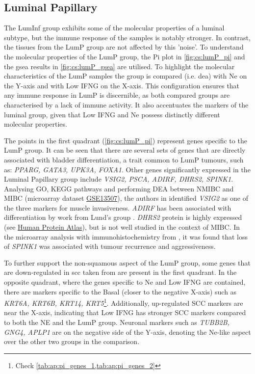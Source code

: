 \subsection{Luminal Papillary} \label{s:cs:lumP_interp}

The LumInf group exhibits some of the molecular properties of a luminal subtype, but the immune response of the samples is notably stronger. In contrast, the tissues from the LumP group are not affected by this 'noise'. To understand the molecular properties of the LumP group, the Pi plot in \cref{fig:cs:lumP_pi} and the \acrshort{gsea} results in \cref{fig:cs:lumP_gsea} are utilised. To highlight the molecular characteristics of the LumP samples the group  is compared  (i.e. \acrshort{dea}) with Ne on the Y-axis and with Low IFNG on the X-axis. This configuration ensures that any immune response in LumP is discernible, as both compared groups are characterised by a lack of immune activity. It also accentuates the markers of the luminal group, given that Low IFNG and Ne possess distinctly different molecular properties.

The points in the first quadrant (\cref{fig:cs:lumP_pi}) represent genes specific to the LumP group. It can be seen that there are several sets of genes that are directly associated with bladder differentiation, a trait common to LumP tumours, such as: \textit{PPARG, GATA3, UPK3A, FOXA1}. Other genes significantly expressed in the Luminal Papillary group include \textit{VSIG2, PSCA, ADIRF, DHRS2, SPINK1}. Analysing GO, KEGG pathways and performing DEA between NMIBC and MIBC (microarray dataset \href{https://www.ncbi.nlm.nih.gov/geo/query/acc.cgi?acc=GSE13507}{GSE13507}), the authors in \citet{He2021-de} identified \textit{VSIG2} as one of the three markers for muscle invasiveness. \textit{ADIRF} has been associated with differentiation by work from Lund's group \citep{Eriksson2015-lt}. \textit{DHRS2} protein is highly expressed (see \href{https://www.proteinatlas.org/ENSG00000100867-DHRS2/tissue/urinary+bladder}{Human Protein Atlas}), but is not well studied in the context of MIBC. In the microarray analysis with immunohistochemistry from \citet{Rink2013-sv}, it was found that loss of \textit{SPINK1} was associated with tumour recurrence and aggressiveness.

To further support the non-squamous aspect of the LumP group, some genes that are down-regulated in \acrfull{scc} taken from \citet{Knowles2015-mu} are present in the first quadrant. In the opposite quadrant, where the genes specific to Ne and Low IFNG are contained, there are markers specific to the Basal (closer to the negative X-axis) such as \textit{KRT6A, KRT6B, KRT14, KRT5}\footnote{Check \cref{tab:ap:pi_genes_1,tab:ap:pi_genes_2}}. Additionally, up-regulated SCC markers are near the X-axis, indicating that Low IFNG has stronger SCC markers compared to both the NE and the LumP group. Neuronal markers such as \textit{TUBB2B, GNG4, APLP1} are on the negative side of the Y-axis, denoting the Ne-like aspect over the other two groups in the comparison.

